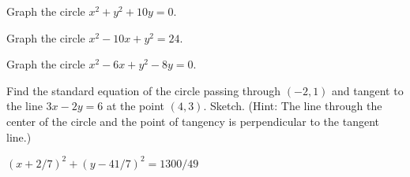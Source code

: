 \begin{exercises}
\begin{exercise}
Graph the circle $x^2+y^2+10y=0$.
\end{exercise}

\begin{exercise}
Graph the circle $x^2-10x+y^2=24$.
\end{exercise}

\begin{exercise}
Graph the circle $x^2-6x+y^2-8y=0$.
\end{exercise}

\begin{exercise} Find the standard equation of the circle passing through $(-2,1)$
 and tangent to the line $3x-2y =6$ at the point $(4,3)$.  Sketch. 
 (Hint: The line through the center of the circle and the point of tangency
 is perpendicular to the tangent line.)
\begin{answer} $(x+2/7)^2+(y-41/7)^2=1300/49$
\end{answer}\end{exercise}

\end{exercises}
